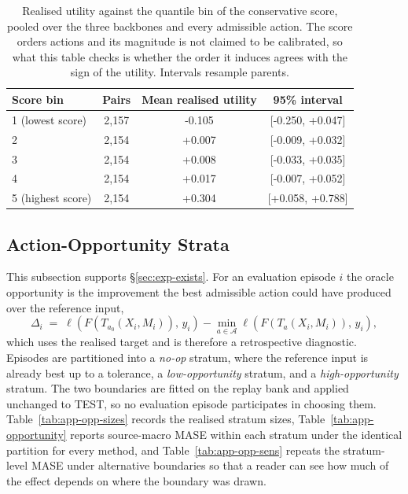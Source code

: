 \documentclass{article}
\newcommand{\calA}{\mathcal{A}}
\newcommand{\loss}{\ell}
\begin{document}
\begin{table}[htbp]
  \caption{Realised utility against the quantile bin of the conservative score, pooled over the
  three backbones and every admissible action. The score orders actions and its magnitude is
  not claimed to be calibrated, so what this table checks is whether the order it induces
  agrees with the sign of the utility. Intervals resample parents.}
  \label{tab:app-scorebins}
  \centering
  \small
  \setlength{\tabcolsep}{4pt}
\begin{tabular}{lccc}
    \toprule
    Score bin & Pairs & Mean realised utility & 95\% interval \\
    \midrule
    1 (lowest score) & 2,157 & -0.105 & [-0.250, +0.047] \\
    2 & 2,154 & +0.007 & [-0.009, +0.032] \\
    3 & 2,154 & +0.008 & [-0.033, +0.035] \\
    4 & 2,154 & +0.017 & [-0.007, +0.052] \\
    5 (highest score) & 2,154 & +0.304 & [+0.058, +0.788] \\
    \bottomrule
  \end{tabular}
\end{table}

\subsection{Action-Opportunity Strata}
\label{app:opportunity}
This subsection supports \S\ref{sec:exp-exists}. For an evaluation episode $i$ the oracle
opportunity is the improvement the best admissible action could have produced over the
reference input,
\begin{equation}
  \Delta_i \;=\; \loss\!\left(F(T_{a_0}(X_i, M_i)),\, y_i\right) - \min_{a \in \calA} \loss\!\left(F(T_{a}(X_i, M_i)),\, y_i\right),
  \label{eq:opportunity}
\end{equation}
which uses the realised target and is therefore a retrospective diagnostic. Episodes are partitioned into a \emph{no-op} stratum, where the reference input is
already best up to a tolerance, a \emph{low-opportunity} stratum, and a
\emph{high-opportunity} stratum. The two boundaries are fitted on the replay bank and applied
unchanged to TEST, so no evaluation episode participates in choosing them.
Table~\ref{tab:app-opp-sizes} records the realised stratum sizes,
Table~\ref{tab:app-opportunity} reports source-macro MASE within each stratum under the
identical partition for every method, and Table~\ref{tab:app-opp-sens} repeats the
stratum-level MASE under alternative boundaries so that a reader can see how much of the
effect depends on where the boundary was drawn.
\end{document}
